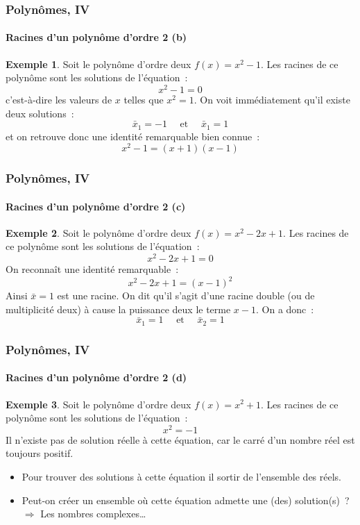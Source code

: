 \documentclass[10pt,notheorems]{beamer}
\theoremstyle{plain}
\theoremstyle{definition} %
\newtheorem{example}{Exemple}
\begin{document}
\begin{frame}
  \frametitle{Polynômes, IV}
  \framesubtitle{Racines d'un polynôme d'ordre 2 (b)}
  \hypertarget{slide_polynome_2_racines_2}{}

  \bigskip

  \begin{example}
    Soit le polynôme d'ordre deux $f(x) = x^2-1$. Les racines de ce polynôme sont les solutions de l'équation~:
    \[
      x^2 - 1 = 0
    \]
    c'est-à-dire les valeurs de $x$ telles que $x^2=1$. On voit immédiatement qu'il existe deux solutions~:
    \[
      \bar x_1 = -1\quad\text{ et }\quad \bar x_1 = 1
    \]
    et on retrouve donc une identité remarquable bien connue~:
    \[
      x^2-1 = (x+1)(x-1)
    \]
  \end{example}

\end{frame}


\begin{frame}
  \frametitle{Polynômes, IV}
  \framesubtitle{Racines d'un polynôme d'ordre 2 (c)}
  \hypertarget{slide_polynome_2_racines_3}{}

  \bigskip

  \begin{example}
    Soit le polynôme d'ordre deux $f(x) = x^2-2x+1$. Les racines de ce polynôme sont les solutions de l'équation~:
    \[
      x^2 -2x + 1 = 0
    \]
    On reconnaît une identité remarquable~:
    \[
      x^2 -2x + 1 = (x-1)^2
    \]
    Ainsi $\bar x = 1$ est une racine. On dit qu'il s'agit d'une
    racine double (ou de multiplicité deux) à cause la puissance deux
    le terme $x-1$. On a donc~:
    \[
      \bar x_1 = 1\quad\text{ et }\quad \bar x_2 = 1
    \]
  \end{example}

\end{frame}


\begin{frame}
  \frametitle{Polynômes, IV}
  \framesubtitle{Racines d'un polynôme d'ordre 2 (d)}
  \hypertarget{slide_polynome_2_racines_4}{}

  \bigskip

  \begin{example}
    Soit le polynôme d'ordre deux $f(x) = x^2+1$. Les racines de ce
    polynôme sont les solutions de l'équation~:
    \[
      x^2 = -1
    \]
    Il n'existe pas de solution réelle à cette équation, car le carré
    d'un nombre réel est toujours positif.
  \end{example}

  \bigskip

  \begin{itemize}

  \item Pour trouver des solutions à cette équation il sortir de l'ensemble des réels.\newline

  \item Peut-on créer un ensemble où cette équation admette une (des) solution(s)~? $\Rightarrow$ Les nombres complexes\ldots

  \end{itemize}

\end{frame}
\end{document}

